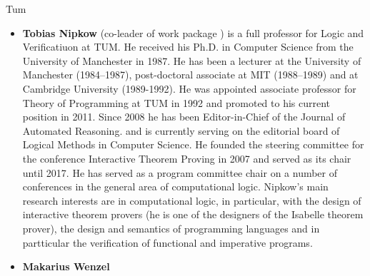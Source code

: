 \begin{sitedescription}{Tum}
\begin{itemize}
\item \textbf{Tobias Nipkow} (co-leader of work package
  ) is a full professor for Logic and
  Verificatiuon at TUM. He received his Ph.D. in Computer Science
  from the University of Manchester in 1987.  He has been a
  lecturer at the University of Manchester (1984--1987),
  post-doctoral associate at MIT (1988--1989) and at Cambridge
  University (1989-1992). He was appointed associate professor for Theory of Programming at
  TUM in 1992 and promoted to his current position in 2011. Since 2008
  he has been Editor-in-Chief of the  Journal of Automated Reasoning.
 and is currently serving on the editorial board of Logical Methods in
 Computer Science. He founded the steering committee for the
 conference Interactive Theorem Proving in 2007 and served as its
 chair until 2017.
 He has served as a program committee chair
on a number of conferences in the general area of computational logic.  Nipkow's main research
interests are in computational logic, in particular, with the design of
interactive theorem provers (he is one of the designers of the
Isabelle theorem prover), the design and semantics of programming
languages and in partticular the verification of functional and
imperative programs.
\item \textbf{Makarius Wenzel}
\end{itemize}

\end{sitedescription}

